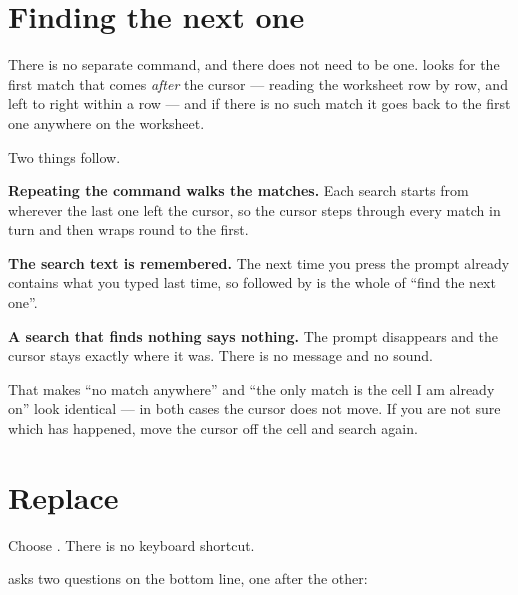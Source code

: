 \section{Finding the next one}

There is no separate  command, and there does not need to be
one. \ccprod{} looks for the first match that comes \emph{after} the cursor ---
reading the worksheet row by row, and left to right within a row --- and if
there is no such match it goes back to the first one anywhere on the worksheet.

Two things follow.

\begin{ccsteps}
\item \textbf{Repeating the command walks the matches.} Each search starts from
wherever the last one left the cursor, so the cursor steps through every match
in turn and then wraps round to the first.
\item \textbf{The search text is remembered.} The next time you press
 the prompt already contains what you typed last time, so
 followed by  is the whole of ``find the next one''.
\end{ccsteps}

\begin{cccaution}
\textbf{A search that finds nothing says nothing.} The prompt disappears and the
cursor stays exactly where it was. There is no  message and no
sound.

That makes ``no match anywhere'' and ``the only match is the cell I am already
on'' look identical --- in both cases the cursor does not move. If you are not
sure which has happened, move the cursor off the cell and search again.
\end{cccaution}

\section{Replace}

Choose . There is no keyboard shortcut.

\ccprod{} asks two questions on the bottom line, one after the other:

\begin{ccfigure}
\caption{The two Replace prompts}
\label{fig:replace}
\end{ccfigure}

